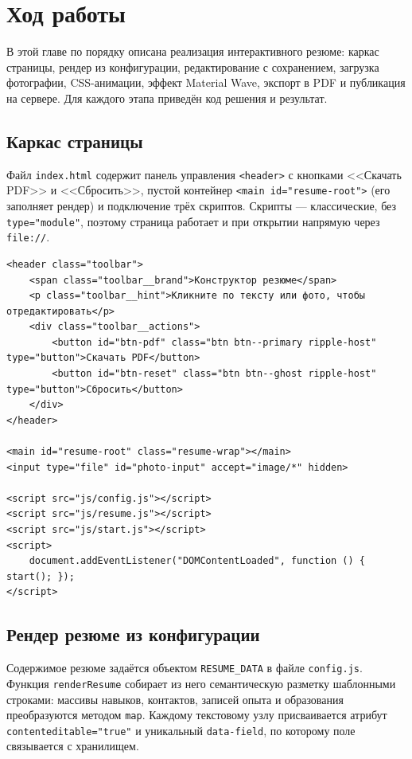\chapter{Ход работы}
\label{ch:practice}

В этой главе по порядку описана реализация интерактивного резюме: каркас
страницы, рендер из конфигурации, редактирование с сохранением, загрузка
фотографии, CSS-анимации, эффект Material Wave, экспорт в PDF и публикация
на сервере. Для каждого этапа приведён код решения и результат.

\section{Каркас страницы}

Файл \texttt{index.html} содержит панель управления \texttt{<header>} с
кнопками <<Скачать PDF>> и <<Сбросить>>, пустой контейнер
\texttt{<main~id="resume-root">} (его заполняет рендер) и подключение трёх
скриптов. Скрипты --- классические, без \texttt{type="module"}, поэтому
страница работает и при открытии напрямую через \texttt{file://}.

\begin{lstlisting}[caption={Ключевая часть \texttt{index.html}},captionpos=b]
<header class="toolbar">
    <span class="toolbar__brand">Конструктор резюме</span>
    <p class="toolbar__hint">Кликните по тексту или фото, чтобы отредактировать</p>
    <div class="toolbar__actions">
        <button id="btn-pdf" class="btn btn--primary ripple-host" type="button">Скачать PDF</button>
        <button id="btn-reset" class="btn btn--ghost ripple-host" type="button">Сбросить</button>
    </div>
</header>

<main id="resume-root" class="resume-wrap"></main>
<input type="file" id="photo-input" accept="image/*" hidden>

<script src="js/config.js"></script>
<script src="js/resume.js"></script>
<script src="js/start.js"></script>
<script>
    document.addEventListener("DOMContentLoaded", function () { start(); });
</script>
\end{lstlisting}

\section{Рендер резюме из конфигурации}

Содержимое резюме задаётся объектом \texttt{RESUME\_DATA} в файле
\texttt{config.js}. Функция \texttt{renderResume} собирает из него
семантическую разметку шаблонными строками: массивы навыков, контактов,
записей опыта и образования преобразуются методом \texttt{map}. Каждому
текстовому узлу присваивается атрибут \texttt{contenteditable="true"} и
уникальный \texttt{data-field}, по которому поле связывается с хранилищем.

